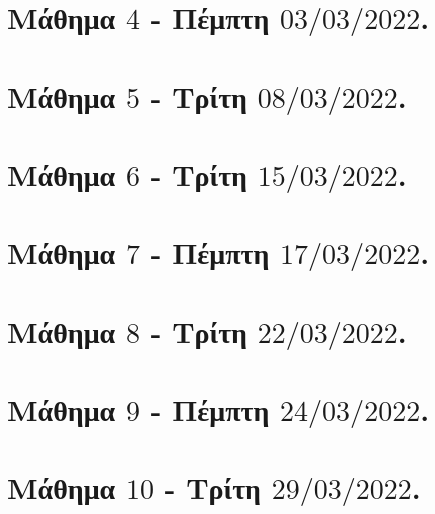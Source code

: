 \documentclass[oneside,a4paper]{article}
\begin{document}
\pagebreak

\section*{Μάθημα $4$ - Πέμπτη $03/03/2022$.}
\vspace{0.3truecm}


\pagebreak


\section*{Μάθημα $5$ - Τρίτη $08/03/2022$.}
\vspace{0.3truecm}


\pagebreak


\section*{Μάθημα $6$ - Τρίτη $15/03/2022$.}
\vspace{0.3truecm}


\pagebreak


\section*{Μάθημα $7$ - Πέμπτη $17/03/2022$.}
\vspace{0.3truecm}


\pagebreak



\section*{Μάθημα $8$ - Τρίτη $22/03/2022$.}
\vspace{0.3truecm}


\pagebreak


\section*{Μάθημα $9$ - Πέμπτη $24/03/2022$.}
\vspace{0.3truecm}


\pagebreak


\section*{Μάθημα $10$ - Τρίτη $29/03/2022$.}
\vspace{0.3truecm}

\end{document}
